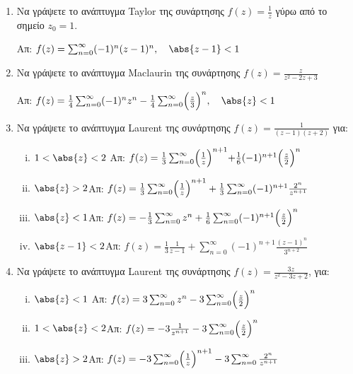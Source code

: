 




\everymath{\displaystyle}



\begin{center}
\end{center}

\vspace{\baselineskip} 

\begin{enumerate}

\item Να γράψετε το ανάπτυγμα Taylor της συνάρτησης $f(z)=\frac{1}{z}$ γύρω από το σημείο $z_0=1$. 

\hfill Απ: $f(z)=\sum_{n=0}^{\infty}(-1)^n(z-1)^n, \quad \abs{z-1}<1$

\item Να γράψετε το ανάπτυγμα Maclaurin της συνάρτησης $f(z)=\frac{z}{z^2-2z+3}$

\hfill Απ: $f(z)=\frac{1}{4}\sum_{n=0}^{\infty}(-1)^nz^n-\frac{1}{4}\sum_{n=0}^{\infty}\Bigl(\frac{z}{3}\Bigr)^n, \quad \abs{z}<1$

\item Να γράψετε το ανάπτυγμα Laurent της συνάρτησης $f(z)=\frac{1}{(z-1)(z+2)}$ για:

\begin{enumerate}[i)]
\item $1<\abs{z}<2$ \hfill Απ: $f(z)=\frac{1}{3}\sum_{n=0}^{\infty}\Bigl(\frac{1}{z}\Bigl)^{n+1}+\frac{1}{6}(-1)^{n+1}\Bigl(\frac{z}{2}\Bigl)^n$
\item $\abs{z}>2$\hfill Απ: $f(z)=\frac{1}{3}\sum_{n=0}^{\infty}\Bigl(\frac{1}{z}\Big)^{n+1}+\frac{1}{3}\sum_{n=0}^{\infty}(-1)^{n+1}\frac{2^n}{z^{n+1}}$
\item $\abs{z}<1$\hfill Απ: $f(z)=-\frac{1}{3}\sum_{n=0}^{\infty}z^n+\frac{1}{6}\sum_{n=0}^{\infty}(-1)^{n+1}\Bigl(\frac{z}{2}\Bigr)^n$
\item $\abs{z-1}<2$\hfill Απ: $f(z)=\frac{1}{3}\frac{1}{z-1}+\sum_{n=0}^{\infty}(-1)^{n+1}\frac{(z-1)^n}{3^{n+2}}$
\end{enumerate}


\item Να γράψετε το ανάπτυγμα Laurent της συνάρτησης $f(z)=\frac{3z}{z^2-3z+2}$, για: 

\begin{enumerate}[i)]
\item $\abs{z}<1\hfill$  Απ: $f(z)=3\sum_{n=0}^{\infty}z^n-3\sum_{n=0}^{\infty}\Bigl(\frac{z}{2}\Bigr)^n$
\item $1<\abs{z}<2$\hfill Απ: $f(z)=-3\frac{1}{z^{n+1}}-3\sum_{n=0}^{\infty}\Bigl(\frac{z}{2}\Bigr)^n$
\item $\abs{z}>2$\hfill Απ: $f(z)=-3\sum_{n=0}^{\infty}\Bigl(\frac{1}{z}\Bigr)^{n+1}-3\sum_{n=0}^{\infty}\frac{2^n}{z^{n+1}}$
\end{enumerate}


\end{enumerate}
